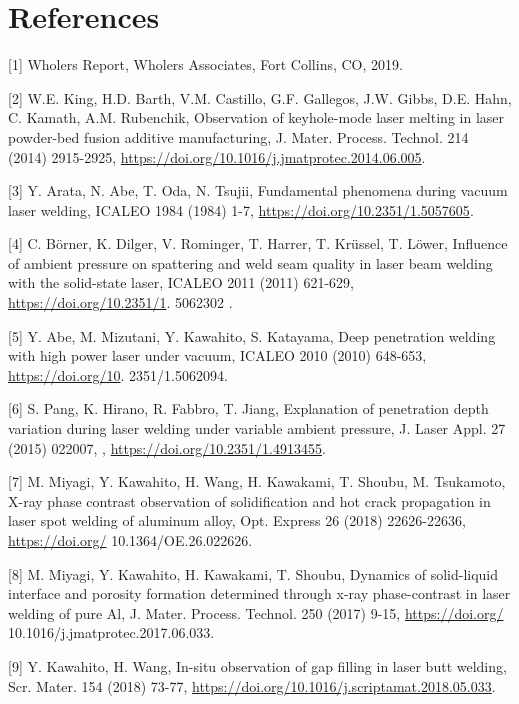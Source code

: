 \documentclass[10pt]{article}
\begin{document}
\section*{References}
[1] Wholers Report, Wholers Associates, Fort Collins, CO, 2019.

[2] W.E. King, H.D. Barth, V.M. Castillo, G.F. Gallegos, J.W. Gibbs, D.E. Hahn, C. Kamath, A.M. Rubenchik, Observation of keyhole-mode laser melting in laser powder-bed fusion additive manufacturing, J. Mater. Process. Technol. 214 (2014) 2915-2925, \href{https://doi.org/10.1016/j.jmatprotec.2014.06.005}{https://doi.org/10.1016/j.jmatprotec.2014.06.005}.

[3] Y. Arata, N. Abe, T. Oda, N. Tsujii, Fundamental phenomena during vacuum laser welding, ICALEO 1984 (1984) 1-7, \href{https://doi.org/10.2351/1.5057605}{https://doi.org/10.2351/1.5057605}.

[4] C. Börner, K. Dilger, V. Rominger, T. Harrer, T. Krüssel, T. Löwer, Influence of ambient pressure on spattering and weld seam quality in laser beam welding with the solid-state laser, ICALEO 2011 (2011) 621-629, \href{https://doi.org/10.2351/1}{https://doi.org/10.2351/1}. 5062302 .

[5] Y. Abe, M. Mizutani, Y. Kawahito, S. Katayama, Deep penetration welding with high power laser under vacuum, ICALEO 2010 (2010) 648-653, \href{https://doi.org/10}{https://doi.org/10}. 2351/1.5062094.

[6] S. Pang, K. Hirano, R. Fabbro, T. Jiang, Explanation of penetration depth variation during laser welding under variable ambient pressure, J. Laser Appl. 27 (2015) 022007, , \href{https://doi.org/10.2351/1.4913455}{https://doi.org/10.2351/1.4913455}.

[7] M. Miyagi, Y. Kawahito, H. Wang, H. Kawakami, T. Shoubu, M. Tsukamoto, X-ray phase contrast observation of solidification and hot crack propagation in laser spot welding of aluminum alloy, Opt. Express 26 (2018) 22626-22636, \href{https://doi.org/}{https://doi.org/} 10.1364/OE.26.022626.

[8] M. Miyagi, Y. Kawahito, H. Kawakami, T. Shoubu, Dynamics of solid-liquid interface and porosity formation determined through x-ray phase-contrast in laser welding of pure Al, J. Mater. Process. Technol. 250 (2017) 9-15, \href{https://doi.org/}{https://doi.org/} 10.1016/j.jmatprotec.2017.06.033.

[9] Y. Kawahito, H. Wang, In-situ observation of gap filling in laser butt welding, Scr. Mater. 154 (2018) 73-77, \href{https://doi.org/10.1016/j.scriptamat.2018.05.033}{https://doi.org/10.1016/j.scriptamat.2018.05.033}.
\end{document}
